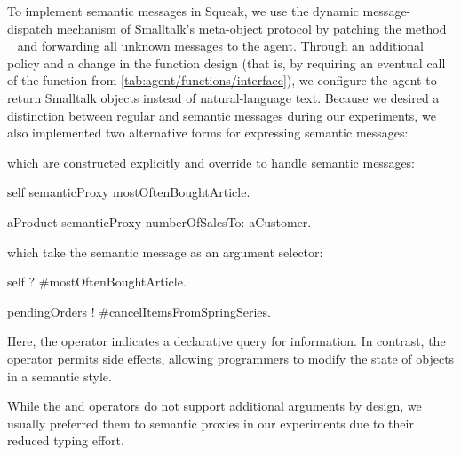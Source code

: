 To implement semantic messages in Squeak, we use the dynamic message-dispatch mechanism of Smalltalk's meta-object protocol by patching the method ~\cite[sec.~5.11]{ingalls2020evolution} and forwarding all unknown messages to the agent.
Through an additional policy and a change in the function design (that is, by requiring an eventual call of the  function from \cref{tab:agent/functions/interface}), we configure the agent to return Smalltalk objects instead of natural-language text.
Because we desired a distinction between regular and semantic messages during our experiments, we also implemented two alternative forms for expressing semantic messages:
\begin{description}[noextralabelsep]
	\item[Semantic proxies,] which are constructed explicitly and override  to handle semantic messages:
	\begin{multicode}
		self semanticProxy mostOftenBoughtArticle.

		aProduct semanticProxy numberOfSalesTo: aCustomer.
	\end{multicode}
	\item[The \code{?} and \code{!} operators,] which take the semantic message as an argument selector:
	\begin{multicode}
		self ? \#mostOftenBoughtArticle.

		pendingOrders ! \#cancelItemsFromSpringSeries.
	\end{multicode}
	Here, the  operator indicates a declarative query for information.
	In contrast, the \code{!} operator permits side effects, allowing programmers to modify the state of objects in a semantic style.
\end{description}
While the  and \code{!} operators do not support additional arguments by design, we usually preferred them to semantic proxies in our experiments due to their reduced typing effort.
